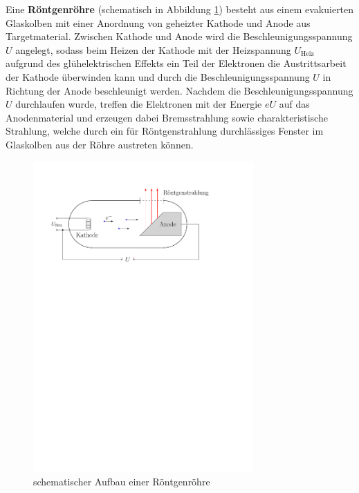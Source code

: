 \documentclass[11pt, a4paper]{article}
\numberwithin{equation}{section}
\begin{document}
Eine \textbf{Röntgenröhre} (schematisch in Abbildung \ref{fig:roehre}) besteht aus einem evakuierten Glaskolben mit einer Anordnung von geheizter Kathode und Anode aus Targetmaterial.
Zwischen Kathode und Anode wird die Beschleunigungsspannung $U$ angelegt, sodass beim Heizen der Kathode mit der Heizspannung $U_\mathrm{Heiz}$ aufgrund des glühelektrischen Effekts ein Teil der Elektronen die Austrittsarbeit der Kathode überwinden kann und durch die Beschleunigungsspannung $U$ in Richtung der Anode beschleunigt werden.
Nachdem die Beschleunigungsspannung $U$ durchlaufen wurde, treffen die Elektronen mit der Energie $e U$ auf das Anodenmaterial und erzeugen dabei Bremsstrahlung sowie charakteristische Strahlung, welche durch ein für Röntgenstrahlung durchlässiges Fenster im Glaskolben aus der Röhre austreten können.
\begin{figure}[ht]
	\centering
	\includegraphics[width=0.75\textwidth]{./figures/roentgenroehre.pdf}
	\caption{schematischer Aufbau einer Röntgenröhre}
	\label{fig:roehre}
\end{figure}
\end{document}
